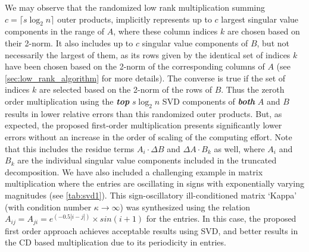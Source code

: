 \documentclass[onefignum,onetabnum]{siamart171218}
\begin{document}
We may observe that the randomized low rank multiplication summing $c= \lceil s \log_2 n \rceil$ outer products, implicitly represents up to $c$ largest singular value components in the range of $A$, where these column indices $k$ are chosen based on their 2-norm. It also includes up to $c$ singular value components of $B$, but not necessarily the largest of them, as its rows given by the identical set of indices $k$ have been chosen based on the 2-norm of the corresponding columns of $A$ (see \cref{sec:low_rank_algorithm} for more details). The converse is true if the set of indices $k$ are selected based on the 2-norm of the rows of $B$. Thus the zeroth order multiplication using the \textit{\textbf{top}} $s\log_2 n$ SVD components of \textit{\textbf{both}} $A$ and $B$ results in lower relative errors than this randomized outer products. But, as expected, the proposed first-order multiplication presents significantly lower errors without an increase in the order of scaling of the computing effort. Note that this includes the residue terms $A_i \cdot \Delta B$ and $\Delta A \cdot B_k$ as well, where $A_i$ and $B_k$ are the individual singular value components included in the truncated decomposition. We have also included a challenging example in matrix multiplication where the entries are oscillating in signs with exponentially varying magnitudes (see \cref{tab:svd1}). This sign-oscillatory ill-conditioned matrix `Kappa' (with condition number $\kappa \to \infty$) was synthesized using the relation $A_{ij}=A_{ji}=e^{(-0.5|i-j|)}\times sin(i+1)$ for the entries. In this case, the proposed first order approach achieves acceptable results using SVD, and better results in the CD based multiplication due to its periodicity in entries.
\end{document}
